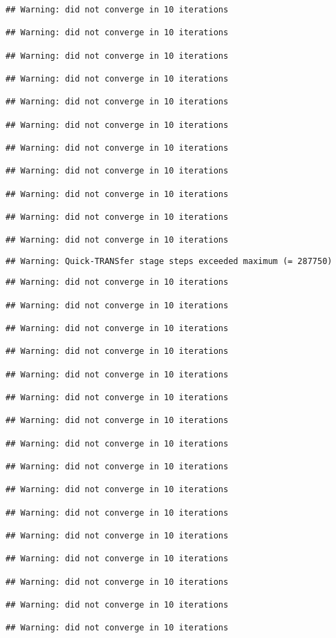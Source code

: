 \documentclass[
]{book}
\begin{document}
\begin{verbatim}
## Warning: did not converge in 10 iterations

## Warning: did not converge in 10 iterations

## Warning: did not converge in 10 iterations

## Warning: did not converge in 10 iterations

## Warning: did not converge in 10 iterations

## Warning: did not converge in 10 iterations

## Warning: did not converge in 10 iterations

## Warning: did not converge in 10 iterations

## Warning: did not converge in 10 iterations

## Warning: did not converge in 10 iterations

## Warning: did not converge in 10 iterations
\end{verbatim}

\begin{verbatim}
## Warning: Quick-TRANSfer stage steps exceeded maximum (= 287750)
\end{verbatim}

\begin{verbatim}
## Warning: did not converge in 10 iterations

## Warning: did not converge in 10 iterations

## Warning: did not converge in 10 iterations

## Warning: did not converge in 10 iterations

## Warning: did not converge in 10 iterations

## Warning: did not converge in 10 iterations

## Warning: did not converge in 10 iterations

## Warning: did not converge in 10 iterations

## Warning: did not converge in 10 iterations

## Warning: did not converge in 10 iterations

## Warning: did not converge in 10 iterations

## Warning: did not converge in 10 iterations

## Warning: did not converge in 10 iterations

## Warning: did not converge in 10 iterations

## Warning: did not converge in 10 iterations

## Warning: did not converge in 10 iterations
\end{verbatim}
\end{document}
